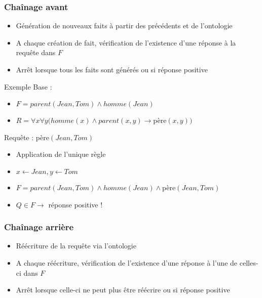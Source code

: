 \begin{frame}[t]
	\frametitle{Chaînage avant}
	\begin{itemize}
		\item Génération de nouveaux faits à partir des précédents et de l'ontologie
		\item A chaque création de fait, vérification de l'existence d'une réponse à la 
		requête dans $F$
		\item Arrêt lorsque tous les faits sont générés ou si réponse positive
	\end{itemize}

	\begin{exampleblock}{Exemple}
	Base :
	\begin{itemize}
		\item $F = parent(Jean,Tom) \wedge homme(Jean)$
		\item $R = \forall x \forall y (homme(x) \wedge parent(x,y) \rightarrow
		$père$(x,y))$
	\end{itemize}
	Requête : père$(Jean,Tom)$
	\begin{itemize}
		\item Application de l'unique règle
		\item $x \leftarrow Jean, y \leftarrow Tom$
		\item $F = parent(Jean,Tom) \wedge homme(Jean) \wedge $père$(Jean,Tom)$
		\item $Q \in F \rightarrow$ réponse positive !
	\end{itemize}
	\end{exampleblock}
\end{frame}


\begin{frame}[t]
	\frametitle{Chaînage arrière}
	\begin{itemize}
		\item Réécriture de la requête via l'ontologie
		\item A chaque réécriture, vérification de l'existence d'une réponse à l'une de
		celles-ci dans $F$
		\item Arrêt lorsque celle-ci ne peut plus être réécrire ou si réponse positive
	\end{itemize}
\end{frame}



